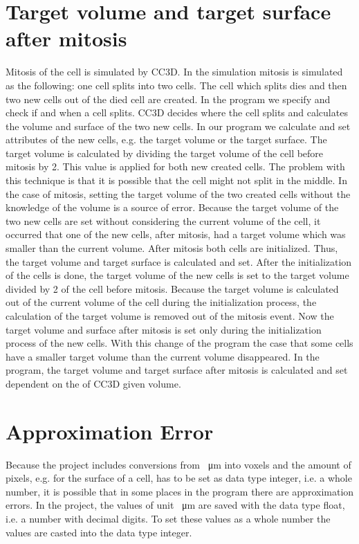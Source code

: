 \section{Target volume and target surface after mitosis} \label{sec:TargetVolumeSurfaceAfterMitosis}
Mitosis of the cell is simulated by \ac{CC3D}. In the simulation mitosis is simulated as the following: one cell splits into two cells. The cell which splits dies and then two new cells out of the died cell are created. \newline
In the program we specify and check if and when a cell splits. \ac{CC3D} decides where the cell splits and calculates the volume and surface of the two new cells. In our program we calculate and set attributes of the new cells, e.g. the target volume or the target surface. \newline 
The target volume is calculated by dividing the target volume of the cell before mitosis by 2. This value is applied for both new created cells. The problem with this technique is that it is possible that the cell might not split in the middle. In the case of mitosis, setting the target volume of the two created cells without the knowledge of the volume is a source of error. Because the target volume of the two new cells are set without considering the current volume of the cell, it occurred that one of the new cells, after mitosis, had a target volume which was smaller than the current volume. \newline
After mitosis both cells are initialized. Thus, the target volume and target surface is calculated and set. After the initialization of the cells is done, the target volume of the new cells is set to the target volume divided by 2 of the cell before mitosis. \newline
Because the target volume is calculated out of the current volume of the cell during the initialization process, the calculation of the target volume is removed out of the mitosis event. Now the target volume and surface after mitosis is set only during the initialization process of the new cells. \newline
With this change of the program the case that some cells have a smaller target volume than the current volume disappeared. In the program, the target volume and target surface after mitosis is calculated and set dependent on the of \ac{CC3D} given volume.



\section{Approximation Error} \label{sec:ApproximationError}
Because the project includes conversions from \SI{}{\micro\metre} into voxels and the amount of pixels, e.g. for the surface of a cell, has to be set as data type integer, i.e. a whole number, it is possible that in some places in the program there are approximation errors. In the project, the values of unit \SI{}{\micro\metre} are saved with the data type float, i.e. a number with decimal digits. To set these values as a whole number the values are casted into the data type integer. 

